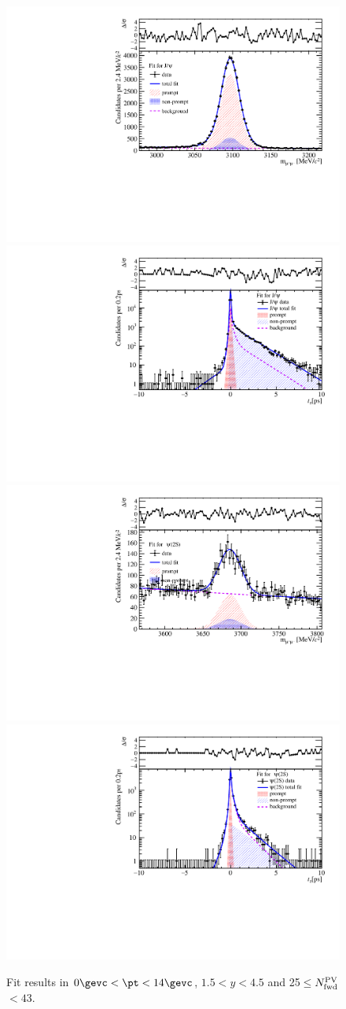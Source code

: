 \begin{figure}[H]
\begin{center}
\includegraphics[width=0.45\linewidth]{pdf/pPb/FWorkdir/TwoDimFit/ProjMass/Jpsi_n2y1pt1.pdf}
\includegraphics[width=0.45\linewidth]{pdf/pPb/FWorkdir/TwoDimFit/ProjTz/Jpsi_n2y1pt1.pdf}
\vspace*{-0.5cm}
\includegraphics[width=0.45\linewidth]{pdf/pPb/FWorkdir/TwoDimFit/ProjMass/Psi2S_n2y1pt1.pdf}
\includegraphics[width=0.45\linewidth]{pdf/pPb/FWorkdir/TwoDimFit/ProjTz/Psi2S_n2y1pt1.pdf}
\vspace*{-0.5cm}
\end{center}
\caption{Fit results in $0\gevc<\pt<14\gevc$, $1.5<y<4.5$ and 25$\leq$$N^{\rm PV}_{\rm fwd}$$<43$.}
\end{figure}
